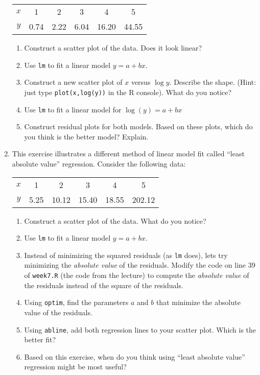 \documentclass[10pt]{article}
\begin{document}
\begin{enumerate}
  \begin{table}[h!]
    \centering
    \begin{tabular}{cccccc}
      \hline
      $x$ & 1 & 2 & 3 & 4 & 5\\
      $y$ & 0.74 & 2.22 & 6.04 & 16.20 & 44.55\\
      \hline
    \end{tabular}
  \end{table}

  \begin{enumerate}
  \item Construct a scatter plot of the data.  Does it look linear?
    \item Use \verb|lm| to fit a linear model $y = a+bx$.  
    \item Construct a new scatter plot of $x$ versus $\log y$.  Describe the shape. (Hint: just type \verb|plot(x,log(y))| in the R console).  What do you notice?
    \item Use \verb|lm| to fit a linear model for $\log(y) = a+bx$
      \item Construct residual plots for both models.  Based on these plots, which do you think is the better model?  Explain.
  \end{enumerate}

\item This exercise illustrates a different method of linear model fit called ``least absolute value'' regression.  Consider the following data:

  \begin{table}[h!]
    \centering
    \begin{tabular}{cccccc}
      \hline
      $x$ & 1 & 2 & 3 & 4 & 5\\
      $y$ & 5.25 &  10.12 &  15.40 & 18.55 & 202.12\\
      \hline
    \end{tabular}
  \end{table}

  \begin{enumerate}
  \item Construct a scatter plot of the data.  What do you notice?
  \item Use \verb|lm| to fit a linear model $y=a+bx$.
  \item Instead of minimizing the squared residuals (as \verb|lm| does), lets try minimizing the \textit{absolute value} of the residuals.  Modify the code on line 39 of \verb|week7.R| (the code from the lecture) to compute the {\it absolute value} of the residuals instead of the square of the residuals.
  \item Using \verb|optim|, find the parameters $a$ and $b$ that minimize the absolute value of the residuals.
  \item Using \verb|abline|, add both regression lines to your scatter plot.  Which is the better fit?
    \item Based on this exercise, when do you think using ``least absolute value'' regression might be most useful?
  \end{enumerate}
  
\end{enumerate}  
\end{document}
